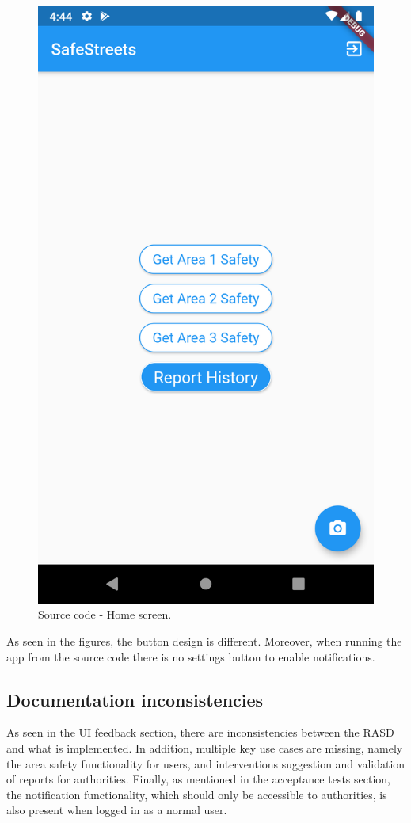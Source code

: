 \begin{figure}[H]
\begin{minipage}{.465\textwidth}
        \includegraphics[width=.8\textwidth]{Images/source-home.png}
        \caption{\label{fig:source-home}Source code - Home screen.}
    \end{minipage}
    \end{figure}

As seen in the figures, the button design is different. Moreover, when running the app from the source code there is no settings button to enable notifications.

\subsection{Documentation inconsistencies}
As seen in the UI feedback section, there are inconsistencies between the RASD and what is implemented. In addition, multiple key use cases are missing, namely the area safety functionality for users, and interventions suggestion and validation of reports for authorities.
Finally, as mentioned in the acceptance tests section, the notification functionality, which should only be accessible to authorities, is also present when logged in as a normal user.